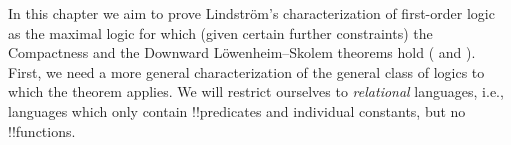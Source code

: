 \documentclass[../../../include/open-logic-section]{subfiles}
\begin{document}

In this chapter we aim to prove Lindstr\"om's characterization of
first-order logic as the maximal logic for which (given certain
further constraints) the Compactness and the Downward
L\"owenheim--Skolem theorems hold
( and
). First, we need a more general
characterization of the general class of logics to which the theorem
applies. We will restrict ourselves to \emph{relational} languages,
i.e., languages which only contain !!{predicate}s and individual
constants, but no !!{function}s.
\end{document}
